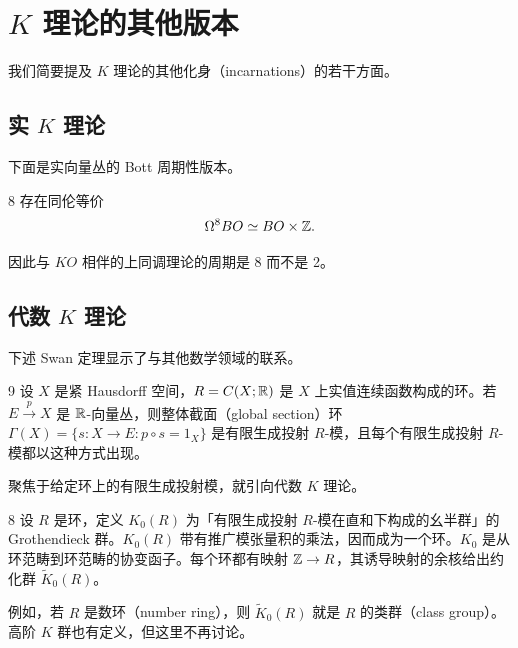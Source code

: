 \section{$K$ 理论的其他版本}

我们简要提及 $K$ 理论的其他化身（incarnations）的若干方面。

\subsection{实 $K$ 理论}

下面是实向量丛的 Bott 周期性版本。

\begin{thm}{8}
  存在同伦等价
  \[ \Omega^8BO\simeq BO\times\mathbb{Z} . \]
\end{thm}

因此与 $KO$ 相伴的上同调理论的周期是 8 而不是 2。

\subsection{代数 $K$ 理论}

下述 Swan 定理显示了与其他数学领域的联系。

\begin{thm}{9}
  设 $X$ 是紧 Hausdorff 空间，$R=C(X;\mathbb{R})$ 是 $X$ 上实值连续函数构成的环。若 $E\xrightarrow{p}X$ 是 $\mathbb{R}$-向量丛，则整体截面（global section）环 $\Gamma(X)=\{s:X\to E : p\circ s=1_X\}$ 是有限生成投射 $R$-模，且每个有限生成投射 $R$-模都以这种方式出现。
\end{thm}

聚焦于给定环上的有限生成投射模，就引向代数 $K$ 理论。

\begin{defn}{8}
  设 $R$ 是环，定义 $K_0(R)$ 为「有限生成投射 $R$-模在直和下构成的幺半群」的 Grothendieck 群。$K_0(R)$ 带有推广模张量积的乘法，因而成为一个环。$K_0$ 是从环范畴到环范畴的协变函子。每个环都有映射 $\mathbb{Z}\to R$，其诱导映射的余核给出约化群 $\widetilde{K}_0(R)$。
\end{defn}

例如，若 $R$ 是数环（number ring），则 $\widetilde{K}_0(R)$ 就是 $R$ 的类群（class group）。高阶 $K$ 群也有定义，但这里不再讨论。
